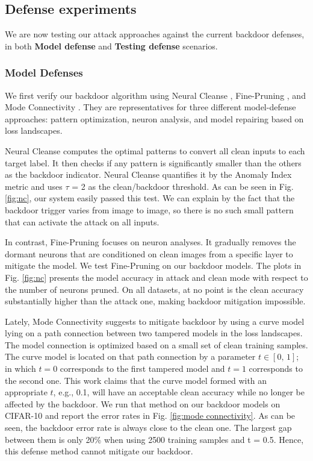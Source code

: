 \documentclass{article}
\begin{document}
\subsection{Defense experiments}
We are now testing our attack approaches against the current backdoor defenses, in both {\bfseries Model defense} and {\bfseries Testing defense} scenarios. 

\subsubsection{Model Defenses}
We first verify our backdoor algorithm using Neural Cleanse \cite{wang2019neural}, Fine-Pruning \cite{liu2018fine}, and Mode Connectivity \cite{zhao2020bridging}. They are representatives for three different model-defense approaches: pattern optimization, neuron analysis, and model repairing based on loss landscapes.

Neural Cleanse computes the optimal patterns to convert all clean inputs to each target label. It then checks if any pattern is significantly smaller than the others as the backdoor indicator. Neural Cleanse quantifies it by the Anomaly Index metric and uses $\tau$ = 2 as the clean/backdoor threshold. As can be seen in Fig.  \ref{fig:nc}, our system easily passed this test. We can explain by the fact that the backdoor trigger varies from image to image, so there is no such small pattern that can activate the attack on all inputs. 


In contrast, Fine-Pruning focuses on neuron analyses. It gradually removes the dormant neurons that are conditioned on clean images from a specific layer to mitigate the model. We test Fine-Pruning on our backdoor models. The plots in Fig. \ref{fig:nc} presents the model accuracy in attack and clean mode with respect to the number of neurons pruned. On all datasets, at no point is the clean accuracy substantially higher than the attack one, making backdoor mitigation impossible.

Lately, Mode Connectivity suggests to mitigate backdoor by using a curve model lying on a path connection between two tampered models in the loss landscapes. The model connection is optimized based on a small set of clean training samples. The curve model is located on that path connection by a parameter $t \in [0,\,1]$; in which $t=0$ corresponds to the first tampered model and $t=1$ corresponds to the second one. This work claims that the curve model formed with an appropriate $t$, e.g., 0.1, will have an acceptable clean accuracy while no longer be affected by the backdoor. We run that method on our backdoor models on CIFAR-10 and report the error rates in Fig. \ref{fig:mode connectivity}. As can be seen, the backdoor error rate is always close to the clean one. The largest gap between them is only 20\% when using 2500 training samples and t = 0.5. Hence, this defense method cannot mitigate our backdoor.
\end{document}
